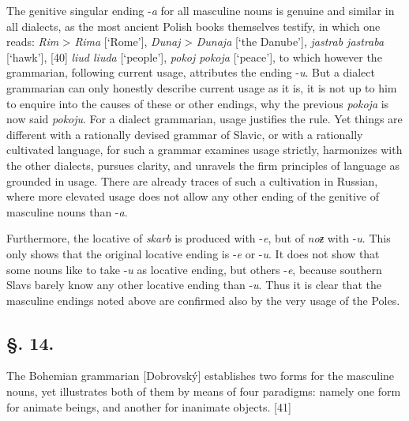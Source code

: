 The genitive singular ending -\textit{a} for all masculine nouns is genuine and similar in all dialects, as the most ancient Polish books themselves testify, in which one reads: \textit{Rim} > \textit{Rima} [‘Rome’], \textit{Dunaj} > \textit{Dunaja} [‘the Danube’], \textit{jastrab jastraba} [‘hawk’], [40] \textit{liud liuda} [‘people’], \textit{pokoj pokoja} [‘peace’], to which however the grammarian, following current usage, attributes the ending -\textit{u}. But a dialect grammarian can only honestly describe current usage as it is, it is not up to him to enquire into the causes of these or other endings, why the previous \textit{pokoja} is now said \textit{pokoju}. For a dialect grammarian, usage justifies the rule. Yet things are different with a rationally devised grammar of Slavic, or with a rationally cultivated language, for such a grammar examines usage strictly, harmonizes with the other dialects, pursues clarity, and unravels the firm principles of language as grounded in usage. There are already traces of such a cultivation in Russian, where more elevated usage does not allow any other ending of the genitive of masculine nouns than -\textit{a}.

Furthermore, the locative of \textit{skarb} is produced with -\textit{e}, but of \textit{noƶ} with -\textit{u}. This only shows that the original locative ending is -\textit{e} or -\textit{u}. It does not show that some nouns like to take -\textit{u} as locative ending, but others -\textit{e}, because southern Slavs barely know any other locative ending than -\textit{u}. Thus it is clear that the masculine endings noted above are confirmed also by the very usage of the Poles.

\subsection*{\hspace*{\fill}§. 14.\hspace*{\fill}}

The Bohemian grammarian [Dobrovský] establishes two forms for the masculine nouns, yet illustrates both of them by means of four paradigms: namely one form for animate beings, and another for inanimate objects. [41]

\enlargethispage{\baselineskip}

